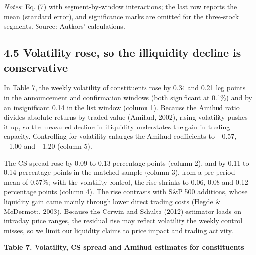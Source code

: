 \documentclass[review,authoryear,12pt]{elsarticle}
\begin{document}
\emph{Notes}: Eq. (7) with segment-by-window interactions; the last row
reports the mean (standard error), and significance marks are omitted
for the three-stock segments. Source: Authors' calculations.

\hypertarget{volatility-rose-so-the-illiquidity-decline-is-conservative}{%
\subsection*{4.5 Volatility rose, so the illiquidity decline is
conservative}}

In Table 7, the weekly volatility of constituents rose by 0.34 and 0.21
log points in the announcement and confirmation windows (both
significant at 0.1\%) and by an insignificant 0.14 in the list window
(column 1). Because the Amihud ratio divides absolute returns by traded
value (Amihud, 2002), rising volatility pushes it up, so the measured
decline in illiquidity understates the gain in trading capacity.
Controlling for volatility enlarges the Amihud coefficients to −0.57,
−1.00 and −1.20 (column 5).

The CS spread rose by 0.09 to 0.13 percentage points (column 2), and by
0.11 to 0.14 percentage points in the matched sample (column 3), from a
pre-period mean of 0.57\%; with the volatility control, the rise shrinks
to 0.06, 0.08 and 0.12 percentage points (column 4). The rise contrasts
with S\&P 500 additions, whose liquidity gain came mainly through lower
direct trading costs (Hegde \& McDermott, 2003). Because the Corwin and
Schultz (2012) estimator loads on intraday price ranges, the residual
rise may reflect volatility the weekly control misses, so we limit our
liquidity claims to price impact and trading activity.

\textbf{Table 7. Volatility, CS spread and Amihud estimates for
constituents}
\end{document}

